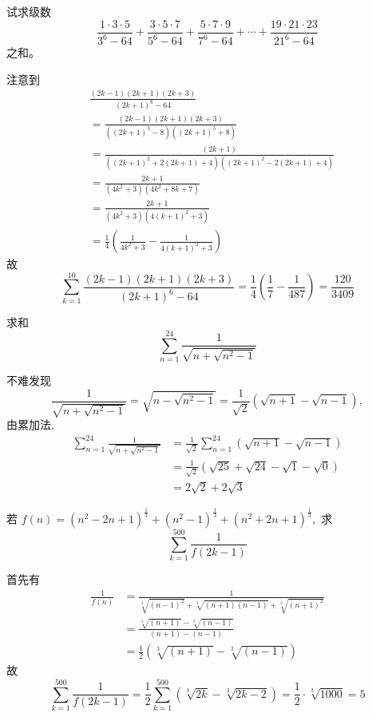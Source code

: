 \begin{questions}
    \question 试求级数
    \[
    \frac{1\cdot 3\cdot 5}{3^6-64} + \frac{3\cdot 5\cdot 7}{5^6-64} + \frac{5\cdot 7\cdot 9}{7^6-64} + \cdots + \frac{19\cdot 21\cdot 23}{21^6-64}
    \] 
    之和。
    \begin{solution}
        注意到
        \begin{align*}
        &\frac{(2k-1)(2k+1)(2k+3)}{(2k+1)^6 - 64}\\
        &= \frac{(2k-1)(2k+1)(2k+3)}{((2k+1)^3-8)((2k+1)^3+8)} \\
        &= \frac{(2k+1)}{((2k+1)^2 + 2(2k+1) + 4)((2k+1)^2 - 2(2k+1) + 4)}\\
        &= \frac{2k+1}{(4k^2 + 3)(4k^2 + 8k + 7)} \\
        &= \frac{2k+1}{(4k^2 + 3)(4(k+1)^2 + 3)}\\
        &= \frac{1}{4} \left( \frac{1}{4k^2 + 3} - \frac{1}{4(k+1)^2 + 3} \right)
        \end{align*}
        故
        \[
        \sum_{k=1}^{10} \frac{(2k-1)(2k+1)(2k+3)}{(2k+1)^6 - 64}= \frac{1}{4} \left( \frac{1}{7} - \frac{1}{487} \right)
        = \frac{120}{3409}
        \]
    \end{solution}

    \question 求和
    \[
    \sum_{n=1}^{24} \frac{1}{\sqrt{n + \sqrt{n^2 - 1}}} 
    \]
    \begin{solution}
        不难发现
        \[
        \frac{1}{\sqrt{n + \sqrt{n^2 - 1}}} = \sqrt{n - \sqrt{n^2 - 1}} = \frac{1}{\sqrt{2}}(\sqrt{n+1} - \sqrt{n-1}),
        \]
        由累加法,
        \begin{align*}
        \sum_{n=1}^{24} \frac{1}{\sqrt{n + \sqrt{n^2 - 1}}} &= \frac{1}{\sqrt{2}} \sum_{n=1}^{24} (\sqrt{n+1} - \sqrt{n-1})\\
        &= \frac{1}{\sqrt{2}} (\sqrt{25} + \sqrt{24} - \sqrt{1} - \sqrt{0})\\
        &=2\sqrt{2} + 2\sqrt{3}
        \end{align*}
    \end{solution}

    \question 若 $f(n)=(n^{2}-2n+1)^{\frac{1}{3}}+(n^{2}-1)^{\frac{1}{3}}+(n^{2}+2n+1)^{\frac{1}{3}},$ 求 
    \[
    \sum_{k=1}^{500}\frac{1}{f(2k-1)}
    \]
    \begin{solution}
        首先有
        \begin{align*}
        \frac{1}{f(n)} &= \frac{1}{\sqrt[3]{(n-1)^2} +\sqrt[3]{(n+1)(n-1)} +\sqrt[3]{(n+1)^2}} \\
        &= \frac{\sqrt[3]{(n+1)} - \sqrt[3]{(n-1)}}{(n+1)-(n-1)} \\
        &= \frac{1}{2}(\sqrt[3]{(n+1)} - \sqrt[3]{(n-1)})
        \end{align*}
        故
        \[
        \sum_{k=1}^{500} \frac{1}{f(2k-1)} = \frac{1}{2} \sum_{k=1}^{500} \left( \sqrt[3]{2k} - \sqrt[3]{2k-2} \right) = \frac{1}{2} \cdot \sqrt[3]{1000} = 5
        \]
    \end{solution}


\end{questions}
